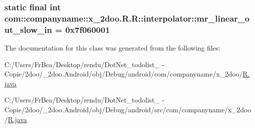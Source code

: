 \hypertarget{classcom_1_1companyname_1_1x__2doo_1_1_r_1_1interpolator_9f0a54e89315def955b203bb3e8e6045}{
\subsubsection[{mr\_\-linear\_\-out\_\-slow\_\-in}]{\setlength{\rightskip}{0pt plus 5cm}static final int com::companyname::x\_\-2doo.R.R::interpolator::mr\_\-linear\_\-out\_\-slow\_\-in = 0x7f060001}}
\label{classcom_1_1companyname_1_1x__2doo_1_1_r_1_1interpolator_9f0a54e89315def955b203bb3e8e6045}




The documentation for this class was generated from the following files:\begin{CompactItemize}
\item 
C:/Users/FrBea/Desktop/rendu/DotNet\_\-todolist\_ - Copie/2doo/\_\-2doo.Android/obj/Debug/android/com/companyname/x\_\-2doo/\hyperlink{com_2companyname_2x__2doo_2_r_8java}{R.java}\item 
C:/Users/FrBea/Desktop/rendu/DotNet\_\-todolist\_ - Copie/2doo/\_\-2doo.Android/obj/Debug/android/src/com/companyname/x\_\-2doo/\hyperlink{src_2com_2companyname_2x__2doo_2_r_8java}{R.java}\end{CompactItemize}

